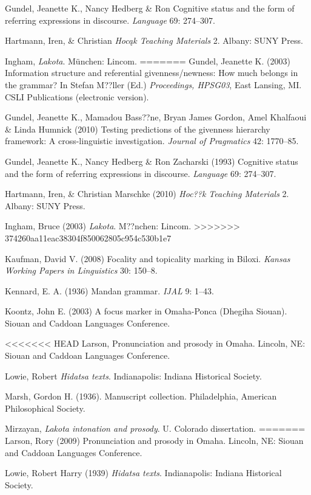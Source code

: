 \documentclass[output=paper]{LSP/langsci}
\begin{document}
\begin{reflist}
\begin{reflist}
Gundel, Jeanette K., Nancy Hedberg \& Ron \citet{Zacharski1993} Cognitive status and the form of referring expressions in discourse. \emph{Language} 69: 274--307.

Hartmann, Iren, \& Christian \citet{Marschke2010} \emph{Hocąk Teaching Materials} 2. Albany: SUNY Press.

Ingham, \citet{Bruce2003} \emph{Lakota}. München: Lincom.
=======
Gundel, Jeanette K. (2003) Information structure and referential givenness/newness: How much belongs in the grammar? In Stefan M??ller (Ed.) \emph{Proceedings, HPSG03}, East Lansing, MI. CSLI Publications (electronic version).

Gundel, Jeanette K., Mamadou Bass??ne, Bryan James Gordon, Amel Khalfaoui \& Linda Humnick (2010) Testing predictions of the givenness hierarchy framework: A cross-linguistic investigation. \emph{Journal of Pragmatics} 42: 1770--85.

Gundel, Jeanette K., Nancy Hedberg \& Ron Zacharski (1993) Cognitive status and the form of referring expressions in discourse. \emph{Language} 69: 274--307.

Hartmann, Iren, \& Christian Marschke (2010) \emph{Hoc??k Teaching Materials} 2. Albany: SUNY Press.

Ingham, Bruce (2003) \emph{Lakota}. M??nchen: Lincom.
>>>>>>> 374260aa11eac38304f850062805c954c530b1e7

Kaufman, David V. (2008) Focality and topicality marking in Biloxi. \emph{Kansas Working Papers in Linguistics} 30: 150--8.

Kennard, E. A. (1936) Mandan grammar. \emph{IJAL} 9: 1--43.

Koontz, John E. (2003) A focus marker in Omaha-Ponca (Dhegiha Siouan). Siouan and Caddoan Languages Conference.

<<<<<<< HEAD
Larson, \citet{Rory2009} Pronunciation and prosody in Omaha. Lincoln, NE: Siouan and Caddoan Languages Conference. 

Lowie, Robert \citet{Harry1939} \emph{Hidatsa texts}. Indianapolis: Indiana Historical Society.

Marsh, Gordon H. (1936). Manuscript collection. Philadelphia, American Philosophical Society.

Mirzayan, \citet{Armik2011} \emph{Lakota intonation and prosody}. U. Colorado dissertation.
=======
Larson, Rory (2009) Pronunciation and prosody in Omaha. Lincoln, NE: Siouan and Caddoan Languages Conference. 

Lowie, Robert Harry (1939) \emph{Hidatsa texts}. Indianapolis: Indiana Historical Society.


\end{reflist}
\end{reflist}
\end{document}
